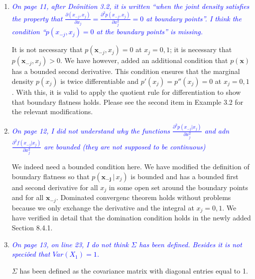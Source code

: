 \documentclass[pdftex,12pt]{article}
\def\rc#1{{\it\textcolor{blue}{#1}}\smallskip}
\begin{document}
\begin{enumerate}


\item \rc{On page 11, after Deônition 3.2, it is written ``when the joint
density satisfies the property that
$\frac{\partial(x_{-j},x_j)}{\partial x_j} = \frac{\partial^2 p(x_{-j},
  x_j)}{\partial x_j^2} = 0$ at boundary points''.
I think the condition ``$p(x_{−j}, x_j ) = 0$ at the boundary points'' is
missing.}

It is not necessary that $p(\mathbf{x}_{-j}, x_j) = 0$ at $x_j = 0,1$; it is necessary that $p(\mathbf{x}_{-j}, x_j) > 0$. We have however, added an additional condition that $p(\mathbf{x})$ has a bounded second derivative. This condition ensures that the marginal density $p(x_j)$ is twice differentiable and $p'(x_j) = p''(x_j) = 0$ at $x_j = 0,1$. With this, it is valid to apply the quotient rule for differentiation to show that boundary flatness holds. Please see the second item in Example 3.2 for the relevant modifications. 


\item \rc{On page 12, I did not understand why the functions 
$\frac{\partial^2 p(x_{-j} |  x_j)}{\partial x_j^2}$
and adn 
$\frac{\partial^2 f(x_{-j} |  x_j)}{\partial x_j^2}$
are bounded (they are not supposed to be continuous)}


We indeed need a bounded condition here. We have modified the definition of boundary flatness so that $p(\mathbf{x_{-j}} \,|\, x_j)$ is bounded and has a bounded first and second derivative for all $x_j$ in some open set around the boundary points and for all $\mathbf{x}_{-j}$. Dominated convergenc theorem holds without problems because we only exchange the derivative and the integral at $x_j = 0,1$. We have verified in detail that the domination condition holds in the newly added Section 8.4.1.


\item \rc{On page 13, on line 23, I do not think $\Sigma$ has been defined. Besides it
is not speciôed that $Var(X_1) = 1$.}

$\Sigma$ has been defined as the covariance matrix with diagonal entries equal to 1.


\end{enumerate}
\end{document}
